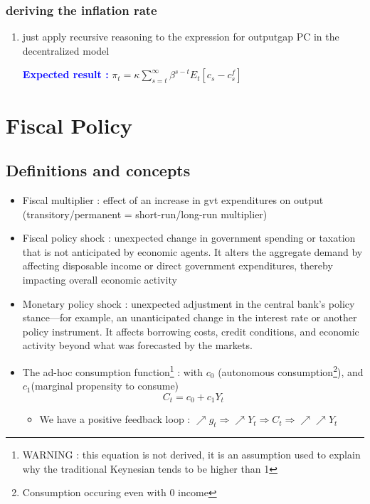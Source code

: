 \documentclass{article}
\begin{document}
\subsubsection{deriving the inflation rate}
\begin{enumerate}
    \item just apply recursive reasoning to the expression for outputgap PC in the decentralized model
    \begin{expectedresultsbox}
        \textcolor{blue}{\textbf{Expected result :}} $\pi_t=\kappa\sum_{s=t}^{\infty}\beta^{s-t}E_t[c_s-c_s^f]$
    \end{expectedresultsbox}
\end{enumerate}


\section{Fiscal Policy}
\subsection{Definitions and concepts}
\begin{itemize}
    \item Fiscal multiplier : effect of an increase in gvt expenditures on output (transitory/permanent = short-run/long-run multiplier)
    \item Fiscal policy shock : unexpected change in government spending or taxation that is not anticipated by economic agents. It alters the aggregate demand by affecting disposable income or direct government expenditures, thereby impacting overall economic activity
    \item Monetary policy shock : unexpected adjustment in the central bank's policy stance—for example, an unanticipated change in the interest rate or another policy instrument. It affects borrowing costs, credit conditions, and economic activity beyond what was forecasted by the markets.
    \item The ad-hoc consumption function\footnote{WARNING : this equation is not derived, it is an assumption used to explain why the traditional Keynesian tends to  be higher than 1} : with $c_0$ (autonomous consumption\footnote{Consumption occuring even with 0 income}), and $c_1$(marginal propensity to consume)
    \begin{equation}
        C_t = c_0 + c_1Y_t
    \end{equation}
    \begin{itemize}
        \item We have a positive feedback loop : $\nearrow g_t \Longrightarrow \nearrow Y_t \Longrightarrow C_t \Longrightarrow \nearrow\nearrow Y_{t}$
    \end{itemize}
\end{itemize}
\end{document}
